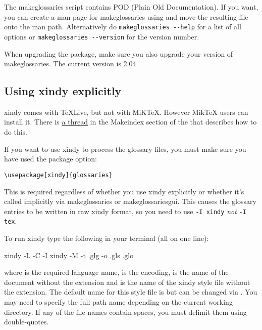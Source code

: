 \documentclass[report]{nlctdoc}
\begin{document}
The \gls{makeglossaries} script contains POD (Plain Old
Documentation). If you want, you can create a man page for
\gls*{makeglossaries} using  and move the 
resulting file onto the man path. Alternatively do
\texttt{makeglossaries -{}-help} for a list of all options or
\texttt{makeglossaries -{}-version} for the version number.

\begin{important}
When upgrading the  package, make sure you also
upgrade your version of \gls{makeglossaries}. The current version is
2.04.
\end{important}

\subsection{Using xindy explicitly}
\label{sec:xindyapp}

\Gls{xindy} comes with TeXLive, but not with MiKTeX. However MikTeX
users can install it. There is
\href{http://www.latex-community.org/forum/viewtopic.php?f=51&t=5383}{a
thread} in the Makeindex section of the
 that
describes how to do this.

If you want to use \gls{xindy} to process the glossary
files, you must make sure you have used the 
 package option:
\begin{verbatim}
\usepackage[xindy]{glossaries}
\end{verbatim}
This is required regardless of whether you use \gls{xindy}
explicitly or whether it's called implicitly via 
\gls{makeglossaries} or \gls{makeglossariesgui}. This causes the glossary 
entries to be written in raw \gls*{xindy} format, so you need to
use \texttt{-I xindy} \emph{not} \texttt{-I tex}.

To run \gls{xindy} type the following in your terminal 
(all on one line):
\begin{prompt}
xindy -L  -C  -I xindy -M  -t .glg -o .gls .glo
\end{prompt}
where  is the required language name, 
is the encoding,  is the name of the document without the
 extension and  is the name of the
\gls{xindy} style file without the  extension.
The default name for this style file is 
but can be changed via . You may need
to specify the full path name depending on the current working
directory. If any of the file names contain spaces, you must delimit
them using double-quotes.
\end{document}

